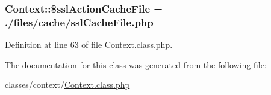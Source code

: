 \subsubsection[{\$ssl\+Action\+Cache\+File}]{\setlength{\rightskip}{0pt plus 5cm}Context\+::\$ssl\+Action\+Cache\+File = \textquotesingle{}./files/cache/ssl\+Cache\+File.\+php\textquotesingle{}}\label{classContext_a5554b6376a0703ebfbdf2bf79800bfee}


Definition at line 63 of file Context.\+class.\+php.



The documentation for this class was generated from the following file\+:\begin{DoxyCompactItemize}
\item 
classes/context/\hyperlink{Context_8class_8php}{Context.\+class.\+php}\end{DoxyCompactItemize}
